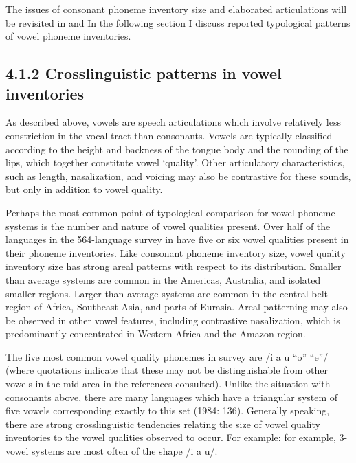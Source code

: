   The issues of consonant phoneme inventory size and elaborated articulations will be revisited in  and  In the following section I discuss reported typological patterns of vowel phoneme inventories.

\subsection{4.1.2 Crosslinguistic patterns in vowel inventories}

  As described above, vowels are speech articulations which involve relatively less constriction in the vocal tract than consonants. Vowels are typically classified according to the height and backness of the tongue body and the rounding of the lips, which together constitute vowel ‘quality’. Other articulatory characteristics, such as length, nasalization, and voicing may also be contrastive for these sounds, but only in addition to vowel quality.

  Perhaps the most common point of typological comparison for vowel phoneme systems is the number and nature of vowel qualities present. Over half of the languages in the 564-language survey in \citet{Maddieson2013c} have five or six vowel qualities present in their phoneme inventories. Like consonant phoneme inventory size, vowel quality inventory size has strong areal patterns with respect to its distribution. Smaller than average systems are common in the Americas, Australia, and isolated smaller regions. Larger than average systems are common in the central belt region of Africa, Southeast Asia, and parts of Eurasia. Areal patterning may also be observed in other vowel features, including contrastive nasalization, which is predominantly concentrated in Western Africa and the Amazon region.

  The five most common vowel quality phonemes in  survey are /i a u “o” “e”/ (where quotations indicate that these may not be distinguishable from other vowels in the mid area in the references consulted). Unlike the situation with consonants above, there are many languages which have a triangular system of five vowels corresponding exactly to this set (1984: 136). Generally speaking, there are strong crosslinguistic tendencies relating the size of vowel quality inventories to the vowel qualities observed to occur. For example: for example, 3-vowel systems are most often of the shape /i a u/. 

